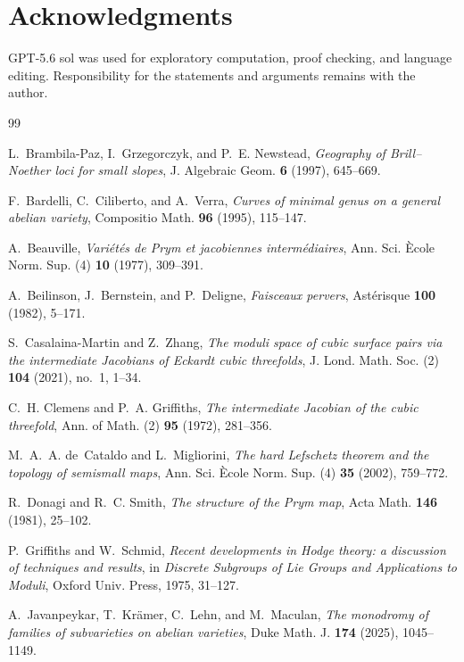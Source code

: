 \documentclass[11pt,reqno]{amsart}
\numberwithin{equation}{section}
\theoremstyle{definition}
\theoremstyle{remark}
\begin{document}
\section*{Acknowledgments}

GPT-5.6 sol was used for exploratory computation, proof checking, and language editing.  Responsibility for the statements and arguments remains with the author.

\begin{thebibliography}{99}

L.~Brambila-Paz, I.~Grzegorczyk, and P.~E. Newstead,
\emph{Geography of Brill--Noether loci for small slopes},
J. Algebraic Geom. \textbf{6} (1997), 645--669.

F.~Bardelli, C.~Ciliberto, and A.~Verra,
\emph{Curves of minimal genus on a general abelian variety},
Compositio Math. \textbf{96} (1995), 115--147.

A.~Beauville,
\emph{Vari\'et\'es de Prym et jacobiennes interm\'ediaires},
Ann. Sci. \`Ecole Norm. Sup. (4) \textbf{10} (1977), 309--391.

A.~Beilinson, J.~Bernstein, and P.~Deligne,
\emph{Faisceaux pervers},
Ast\'erisque \textbf{100} (1982), 5--171.

S.~Casalaina-Martin and Z.~Zhang,
\emph{The moduli space of cubic surface pairs via the intermediate Jacobians of Eckardt cubic threefolds},
J. Lond. Math. Soc. (2) \textbf{104} (2021), no.~1, 1--34.

C.~H. Clemens and P.~A. Griffiths,
\emph{The intermediate Jacobian of the cubic threefold},
Ann. of Math. (2) \textbf{95} (1972), 281--356.

M.~A.~A. de~Cataldo and L.~Migliorini,
\emph{The hard Lefschetz theorem and the topology of semismall maps},
Ann. Sci. \`Ecole Norm. Sup. (4) \textbf{35} (2002), 759--772.

R.~Donagi and R.~C. Smith,
\emph{The structure of the Prym map},
Acta Math. \textbf{146} (1981), 25--102.

P.~Griffiths and W.~Schmid,
\emph{Recent developments in Hodge theory: a discussion of techniques and results},
in \emph{Discrete Subgroups of Lie Groups and Applications to Moduli},
Oxford Univ. Press, 1975, 31--127.

A.~Javanpeykar, T.~Kr\"amer, C.~Lehn, and M.~Maculan,
\emph{The monodromy of families of subvarieties on abelian varieties},
Duke Math. J. \textbf{174} (2025), 1045--1149.


\end{thebibliography}
\end{document}

